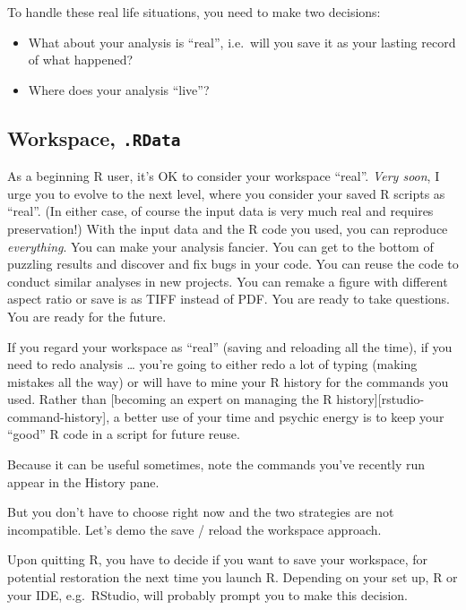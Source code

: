 \documentclass[
]{book}
\providecommand{\tightlist}{%
  \setlength{\itemsep}{0pt}\setlength{\parskip}{0pt}}
\begin{document}
To handle these real life situations, you need to make two decisions:

\begin{itemize}
\tightlist
\item
  What about your analysis is ``real'', i.e.~will you save it as your lasting record of what happened?
\item
  Where does your analysis ``live''?
\end{itemize}

\hypertarget{workspace-.rdata}{%
\subsection{\texorpdfstring{Workspace, \texttt{.RData}}{Workspace, .RData}}\label{workspace-.rdata}}

As a beginning R user, it's OK to consider your workspace ``real''. \emph{Very soon}, I urge you to evolve to the next level, where you consider your saved R scripts as ``real''. (In either case, of course the input data is very much real and requires preservation!) With the input data and the R code you used, you can reproduce
\emph{everything}. You can make your analysis fancier. You can get to the bottom of puzzling results and discover and fix bugs in your code. You can reuse the code to conduct similar analyses in new projects. You can remake a figure with different aspect ratio or save is as TIFF instead of PDF. You are ready to take questions. You are ready for the future.

If you regard your workspace as ``real'' (saving and reloading all the time), if you need to redo analysis \ldots{} you're going to either redo a lot of typing (making mistakes all the way) or will have to mine your R history for the commands you used. Rather than {[}becoming an expert on managing the R history{]}{[}rstudio-command-history{]}, a better use of your time and psychic energy is to keep your ``good'' R code in a script for future reuse.

Because it can be useful sometimes, note the commands you've recently run appear in the History pane.

But you don't have to choose right now and the two strategies are not incompatible. Let's demo the save / reload the workspace approach.

Upon quitting R, you have to decide if you want to save your workspace, for potential restoration the next time you launch R. Depending on your set up, R or your IDE, e.g.~RStudio, will probably prompt you to make this decision.
\end{document}
